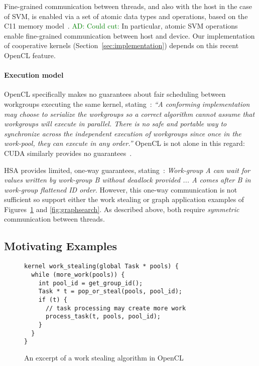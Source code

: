 \documentclass[numbers,nocopyrightspace,10pt]{sigplanconf}
\newcommand{\ADComment}[1]{\textcolor{green}{AD: #1}}
\begin{document}
Fine-grained communication between threads, and also with the host in
the case of SVM, is enabled via a set of atomic data types and
operations, based on the C11 memory model~\cite{...}.  \ADComment{Could cut:} In particular,
atomic SVM operations enable fine-grained communication between host
and device.  Our implementation of cooperative kernels
(Section~\ref{sec:implementation}) depends on this recent OpenCL
feature.

\paragraph{Execution model}

OpenCL specifically makes no guarantees about fair scheduling between
workgroups executing the same kernel, stating~\cite{...}: \emph{``A
  conforming implementation may choose to serialize the workgroups so
  a correct algorithm cannot assume that workgroups will execute in
  parallel.  There is no safe and portable way to synchronize across
  the independent execution of workgroups since once in the work-pool,
  they can execute in any order.''}  OpenCL is not alone in this
regard: CUDA similarly provides no guarantees~\cite{...}.

HSA provides limited, one-way guarantees,
stating~\cite[p. 46]{HSAprogramming11}: \emph{Work-group A can wait
  for values written by work-group B without deadlock provided ... A
  comes after B in work-group flattened ID order}. However, this
one-way communication is not sufficient so support either the
work stealing or graph application examples of
Figures~\ref{fig:workstealing} and \ref{fig:graphsearch}. As described
above, both require \emph{symmetric} communication between
threads.


\subsection{Motivating Examples}\label{sec:openclexamples}

\begin{figure}

\begin{lstlisting}
kernel work_stealing(global Task * pools) {
  while (more_work(pools)) {
    int pool_id = get_group_id();
    Task * t = pop_or_steal(pools, pool_id);
    if (t) {
      // task processing may create more work
      process_task(t, pools, pool_id);
    }
  }
}
\end{lstlisting}

\caption{An excerpt of a work stealing algorithm in OpenCL}\label{fig:workstealing}
\end{figure}
\end{document}
